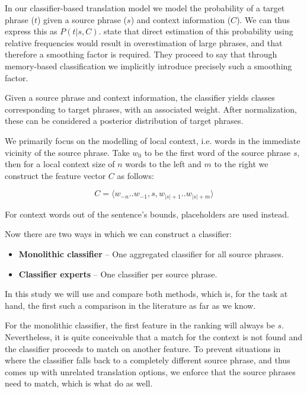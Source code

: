 \documentclass[smallextended]{svjour3}       %
\theoremstyle{break}
\begin{document}
In our classifier-based translation model we model the probability
of a target phrase ($t$) given a source phrase ($s$) and context information
($C$). We can thus express this as $P(t|s,C)$.  \cite{Stroppa+07} state that
direct estimation of this probability using relative frequencies would result
in overestimation of large phrases, and that therefore a smoothing factor is
required. They proceed to say that through memory-based classification we
implicitly introduce precisely such a smoothing factor.

Given a source phrase and context information, the classifier yields classes
corresponding to target phrases, with an associated weight. After
normalization, these can be considered a posterior distribution of
target phrases. 

We primarily focus on the modelling of local context, i.e. words in the
immediate vicinity of the source phrase. Take $w_0$ to be the first word of
the source phrase $s$, then for a local context size of $n$ words to the left and
$m$ to the right we construct the feature vector $C$ as follows:

\begin{equation}
  C = \langle w_{-n} .. w_{-1} , s , w_{|s|+1} .. w_{|s|+m} \rangle
\end{equation}

For context words out of the sentence's bounds, placeholders are used instead.

Now there are two ways in which we can construct a classifier:

\begin{itemize}
  \item \textbf{Monolithic classifier} -- One aggregated classifier for all
    source phrases.
  \item \textbf{Classifier experts} -- One classifier per source phrase.
\end{itemize}

In this study we will use and compare both methods, which is, for the task at
hand, the first such a comparison in the literature as far as we know.

For the monolithic classifier, the first feature in the ranking will always be
$s$. Nevertheless, it is quite conceivable that a match for the context is not
found and the classifier proceeds to match on another feature. To prevent
situations in where the classifier falls back to a completely different source
phrase, and thus comes up with unrelated translation options, we enforce that
the source phrases need to match, which is what \cite{Stroppa+07} do as
well.
\end{document}
